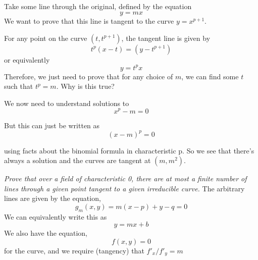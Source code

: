 \documentclass{article}
\begin{document}
\subsection{}

\subsection{}
Take some line through the original, defined by the equation
\begin{equation}
y = mx
\end{equation}
We want to prove that this line is tangent to the curve \(y=x^{p+1}\).

For any point on the curve \((t, t^{p+1})\), the tangent line is given by
\begin{equation}
t^{p}(x-t) = (y-t^{p+1})
\end{equation}
or equivalently
\begin{equation}
y = t^{p}x
\end{equation}
Therefore, we just need to prove that for any choice of \(m\), we can find some \(t\) such that \(t^{p} = m\). Why is this true? 

We now need to understand solutions to
\begin{equation}
x^{p} - m = 0
\end{equation}

But this can just be written as
\begin{equation}
(x - m)^{p} = 0
\end{equation}

using facts about the binomial formula in characteristic p. So we see that there's always a solution and the curves are tangent at \((m, m^{2})\).

\emph{Prove that over a field of characteristic 0, there are at most a finite number of lines through a given point tangent to a given irreducible curve.}
The arbitrary lines are given by the equation,
\begin{equation}
g_{m}(x, y) = m(x-p) + y-q = 0
\end{equation}
We can equivalently write this as
\begin{equation}
y = mx + b
\end{equation}
We also have the equation,
\begin{equation}
f(x, y) = 0
\end{equation}
for the curve, and we require (tangency) that \(f'_{x}/f'_{y} = m\)

\subsection{}
\end{document}
